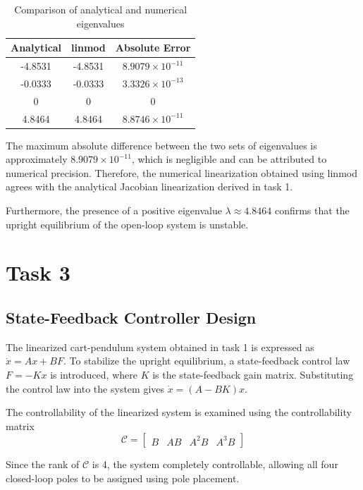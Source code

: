 \documentclass[12pt]{article}
\begin{document}
\begin{table}[htbp]
    \centering
    \begin{tabular}{ccc}
        \hline
        Analytical & linmod & Absolute Error \\
        \hline
        -4.8531 & -4.8531 & $8.9079 \times 10^{-11}$ \\
        -0.0333 & -0.0333 & $3.3326 \times 10^{-13}$ \\
        0 & 0 & $0$ \\
        4.8464 & 4.8464 & $8.8746 \times 10^{-11}$ \\
        \hline
    \end{tabular}
    \caption{Comparison of analytical and numerical eigenvalues}
\end{table}

The maximum absolute difference between the two sets of eigenvalues is approximately $8.9079 \times 10^{-11}$, which is negligible and can be attributed to numerical precision. Therefore, the numerical linearization obtained using linmod agrees with the analytical Jacobian linearization derived in task 1.

Furthermore, the presence of a positive eigenvalue $\lambda \approx 4.8464$ confirms that the upright equilibrium of the open-loop system is unstable.

\section{Task 3}

\subsection{State-Feedback Controller Design}

The linearized cart-pendulum system obtained in task 1 is expressed as $\dot{x} = Ax+BF$. To stabilize the upright equilibrium, a state-feedback control law $F = -Kx$ is introduced, where $K$ is the state-feedback gain matrix. Substituting the control law into the system gives $\dot{x} = (A - BK)x$.

The controllability of the linearized system is examined using the controllability matrix
$$\mathcal{C} = \begin{bmatrix}
    B & AB & A^2B & A^3B
\end{bmatrix}$$

Since the rank of $\mathcal{C}$ is 4, the system completely controllable, allowing all four closed-loop poles to be assigned using pole placement.
\end{document}

